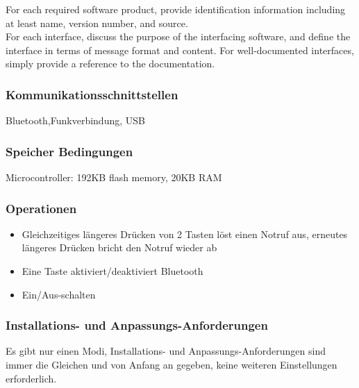 \noindent For each required software product, provide identification information including at least name, version number, and source. \\[-0.3cm]

\noindent For each interface, discuss the purpose of the interfacing software, and define the interface in terms of message format and content. For well-documented interfaces, simply provide a reference to the documentation. \\[-0.3cm]

\subsubsection{Kommunikationsschnittstellen}
Bluetooth,Funkverbindung, USB

\subsubsection{Speicher Bedingungen}
Microcontroller: 192KB flash memory, 20KB RAM

\subsubsection{Operationen}
\begin{itemize}
	\item Gleichzeitiges längeres Drücken von 2 Tasten löst einen Notruf aus, erneutes längeres Drücken bricht den Notruf wieder ab
	\item Eine Taste aktiviert/deaktiviert Bluetooth
	\item Ein/Aus-schalten
\end{itemize}

\subsubsection{Installations- und Anpassungs-Anforderungen}
Es gibt nur einen Modi, Installations- und Anpassungs-Anforderungen sind immer die Gleichen und von Anfang an gegeben, keine weiteren Einstellungen erforderlich.

